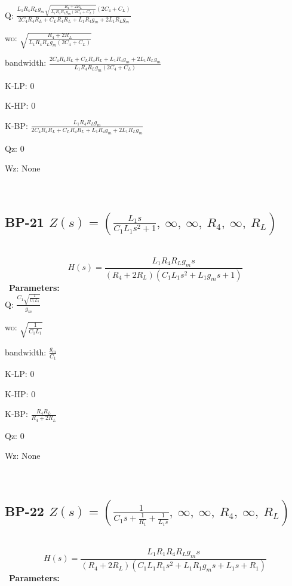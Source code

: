 \documentclass{article}
\begin{document}
Q: $\frac{L_{1} R_{4} R_{L} g_{m} \sqrt{\frac{R_{4} + 2 R_{L}}{L_{1} R_{4} R_{L} g_{m} \left(2 C_{4} + C_{L}\right)}} \left(2 C_{4} + C_{L}\right)}{2 C_{4} R_{4} R_{L} + C_{L} R_{4} R_{L} + L_{1} R_{4} g_{m} + 2 L_{1} R_{L} g_{m}}$\ 

wo: $\sqrt{\frac{R_{4} + 2 R_{L}}{L_{1} R_{4} R_{L} g_{m} \left(2 C_{4} + C_{L}\right)}}$\ 

bandwidth: $\frac{2 C_{4} R_{4} R_{L} + C_{L} R_{4} R_{L} + L_{1} R_{4} g_{m} + 2 L_{1} R_{L} g_{m}}{L_{1} R_{4} R_{L} g_{m} \left(2 C_{4} + C_{L}\right)}$\ 

K-LP: $0$\ 

K-HP: $0$\ 

K-BP: $\frac{L_{1} R_{4} R_{L} g_{m}}{2 C_{4} R_{4} R_{L} + C_{L} R_{4} R_{L} + L_{1} R_{4} g_{m} + 2 L_{1} R_{L} g_{m}}$\ 

Qz: $0$\ 

Wz: $\text{None}$\ 

\ 

\subsection{BP-21 $Z(s) = \left( \frac{L_{1} s}{C_{1} L_{1} s^{2} + 1}, \  \infty, \  \infty, \  R_{4}, \  \infty, \  R_{L}\right)$ } \ 
\textbf{\[H(s) = \frac{L_{1} R_{4} R_{L} g_{m} s}{\left(R_{4} + 2 R_{L}\right) \left(C_{1} L_{1} s^{2} + L_{1} g_{m} s + 1\right)}\] } \ 
\textbf{Parameters:}\\ 

Q: $\frac{C_{1} \sqrt{\frac{1}{C_{1} L_{1}}}}{g_{m}}$\ 

wo: $\sqrt{\frac{1}{C_{1} L_{1}}}$\ 

bandwidth: $\frac{g_{m}}{C_{1}}$\ 

K-LP: $0$\ 

K-HP: $0$\ 

K-BP: $\frac{R_{4} R_{L}}{R_{4} + 2 R_{L}}$\ 

Qz: $0$\ 

Wz: $\text{None}$\ 

\ 

\subsection{BP-22 $Z(s) = \left( \frac{1}{C_{1} s + \frac{1}{R_{1}} + \frac{1}{L_{1} s}}, \  \infty, \  \infty, \  R_{4}, \  \infty, \  R_{L}\right)$ } \ 
\textbf{\[H(s) = \frac{L_{1} R_{1} R_{4} R_{L} g_{m} s}{\left(R_{4} + 2 R_{L}\right) \left(C_{1} L_{1} R_{1} s^{2} + L_{1} R_{1} g_{m} s + L_{1} s + R_{1}\right)}\] } \ 
\textbf{Parameters:}\\ 
\end{document}
